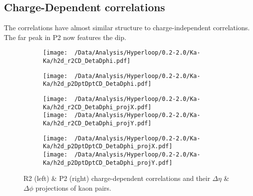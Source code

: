 \documentclass[12pt,a4paper,twoside]{report}
\begin{document}
\subsection{Charge-Dependent correlations}
The correlations have almost similar structure to charge-independent correlations. The far peak in P2 now features the dip.
\begin{figure}[H]
	\begin{subfigure}{0.49\linewidth}
		\texttt{[image: ~/Data/Analysis/Hyperloop/0.2-2.0/Ka-Ka/h2d\_r2CD\_DetaDphi.pdf]}\\
	\end{subfigure}
	\begin{subfigure}{0.49\linewidth}
		\texttt{[image: ~/Data/Analysis/Hyperloop/0.2-2.0/Ka-Ka/h2d\_p2DptDptCD\_DetaDphi.pdf]}\\
	\end{subfigure}
\end{figure}
\begin{figure}[H]
	\ContinuedFloat
	\begin{subfigure}{0.49\linewidth}
		\texttt{[image: ~/Data/Analysis/Hyperloop/0.2-2.0/Ka-Ka/h2d\_r2CD\_DetaDphi\_projX.pdf]}\\
		\texttt{[image: ~/Data/Analysis/Hyperloop/0.2-2.0/Ka-Ka/h2d\_r2CD\_DetaDphi\_projY.pdf]}\\
	\end{subfigure}
	\begin{subfigure}{0.49\linewidth}
		\texttt{[image: ~/Data/Analysis/Hyperloop/0.2-2.0/Ka-Ka/h2d\_p2DptDptCD\_DetaDphi\_projX.pdf]}\\
		\texttt{[image: ~/Data/Analysis/Hyperloop/0.2-2.0/Ka-Ka/h2d\_p2DptDptCD\_DetaDphi\_projY.pdf]}\\
	\end{subfigure}
	\caption{R2 (left) \& P2 (right) charge-dependent correlations and their $\Delta\eta$ \& $\Delta\phi$ projections of kaon pairs.}
\end{figure}
\end{document}

